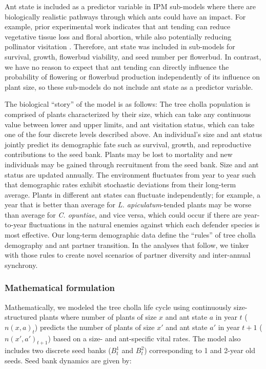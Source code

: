 \documentclass[11pt]{article}
\begin{document}
Ant state is included as a predictor variable in IPM sub-models where there are biologically realistic pathways through which ants could have an impact.
For example, prior experimental work indicates that ant tending can reduce vegetative tissue loss and floral abortion, while also potentially reducing pollinator visitation \citep{Miller2009,Ohm2014}. 
Therefore, ant state was included in sub-models for survival, growth, flowerbud viability, and seed number per flowerbud. 
In contrast, we have no reason to expect that ant tending can directly influence the probability of flowering or flowerbud production independently of its influence on plant size, so these sub-models do not include ant state as a predictor variable. 

The biological ``story'' of the model is as follows: 
The tree cholla population is comprised of plants characterized by their size, which can take any continuous value between lower and upper limits, and ant visitation status, which can take one of the four discrete levels described above. 
An individual's size and ant status jointly predict its demographic fate such as survival, growth, and reproductive contributions to the seed bank. 
Plants may be lost to mortality and new individuals may be gained through recruitment from the seed bank. 
Size and ant status are updated annually.
The environment fluctuates from year to year such that demographic rates exhibit stochastic deviations from their long-term average. 
Plants in different ant states can fluctuate independently; for example, a year that is better than average for \textit{L. apiculatum}-tended plants may be worse than average for \textit{C. opuntiae}, and vice versa, which could occur if there are year-to-year fluctuations in the natural enemies against which each defender species is most effective. 
Our long-term demographic data define the ``rules'' of tree cholla demography and ant partner transition. 
In the analyses that follow, we tinker with those rules to create novel scenarios of partner diversity and inter-annual synchrony.

\subsubsection*{Mathematical formulation}
Mathematically, we modeled the tree cholla life cycle using continuously size-structured plants where number of plants of size $x$  and ant state $a$ in year $t$ ($n(x,a)_{t}$) predicts the number of plants of size $x'$ and ant state $a'$ in year $t+1$ ($n(x',a')_{t+1}$) based on a size- and ant-specific vital rates. 
The model also includes two discrete seed banks ($B^1_{t}$ and $B^2_{t}$) corresponding to 1 and 2-year old seeds. 
Seed bank dynamics are given by:
\end{document}
